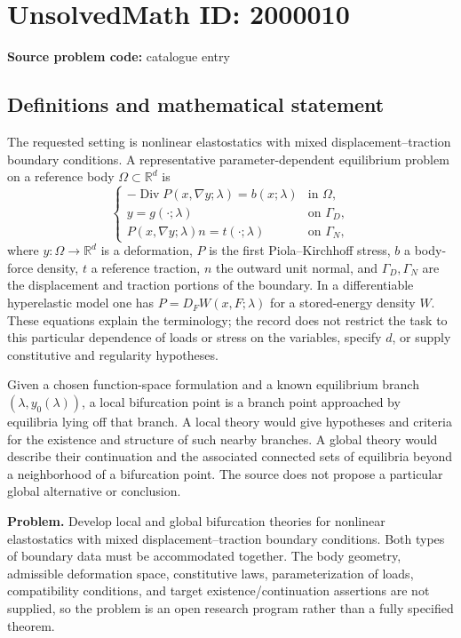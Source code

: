 \documentclass[11pt]{article}
\newcommand{\R}{\mathbb{R}}
\begin{document}
\section*{UnsolvedMath ID: 2000010}
\textbf{Source problem code:} catalogue entry
\subsection{Definitions and mathematical statement}
The requested setting is nonlinear elastostatics with mixed displacement--traction boundary conditions. A representative parameter-dependent equilibrium problem on a reference body $\Omega\subset\R^d$ is
\[
 \begin{cases}
 -\operatorname{Div}P(x,\nabla y;\lambda)=b(x;\lambda)&\text{in }\Omega,\\
 y=g(\cdot;\lambda)&\text{on }\Gamma_D,\\
 P(x,\nabla y;\lambda)n=t(\cdot;\lambda)&\text{on }\Gamma_N,
 \end{cases}
\]
where $y:\Omega\to\R^d$ is a deformation, $P$ is the first Piola--Kirchhoff stress, $b$ a body-force density, $t$ a reference traction, $n$ the outward unit normal, and $\Gamma_D,\Gamma_N$ are the displacement and traction portions of the boundary. In a differentiable hyperelastic model one has $P=D_FW(x,F;\lambda)$ for a stored-energy density $W$. These equations explain the terminology; the record does not restrict the task to this particular dependence of loads or stress on the variables, specify $d$, or supply constitutive and regularity hypotheses.

Given a chosen function-space formulation and a known equilibrium branch $(\lambda,y_0(\lambda))$, a local bifurcation point is a branch point approached by equilibria lying off that branch. A local theory would give hypotheses and criteria for the existence and structure of such nearby branches. A global theory would describe their continuation and the associated connected sets of equilibria beyond a neighborhood of a bifurcation point. The source does not propose a particular global alternative or conclusion.

\textbf{Problem.} Develop local and global bifurcation theories for nonlinear elastostatics with mixed displacement--traction boundary conditions. Both types of boundary data must be accommodated together. The body geometry, admissible deformation space, constitutive laws, parameterization of loads, compatibility conditions, and target existence/continuation assertions are not supplied, so the problem is an open research program rather than a fully specified theorem.
\end{document}
